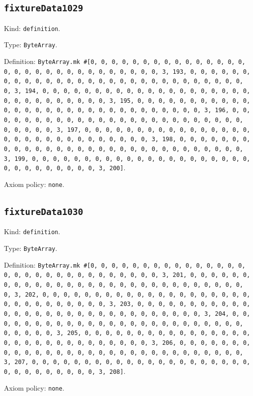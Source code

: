 \documentclass[11pt]{article}
\begin{document}
\subsection*{\texttt{fixtureData1029}}
\noindent Kind: \texttt{definition}.\par
\noindent Type: \texttt{ByteArray}.\par
\noindent Definition: \texttt{ByteArray.mk \#[0, 0, 0, 0, 0, 0, 0, 0, 0, 0, 0, 0, 0, 0, 0, 0, 0, 0, 0, 0, 0, 0, 0, 0, 0, 0, 0, 0, 0, 0, 3, 193, 0, 0, 0, 0, 0, 0, 0, 0, 0, 0, 0, 0, 0, 0, 0, 0, 0, 0, 0, 0, 0, 0, 0, 0, 0, 0, 0, 0, 0, 0, 3, 194, 0, 0, 0, 0, 0, 0, 0, 0, 0, 0, 0, 0, 0, 0, 0, 0, 0, 0, 0, 0, 0, 0, 0, 0, 0, 0, 0, 0, 0, 0, 3, 195, 0, 0, 0, 0, 0, 0, 0, 0, 0, 0, 0, 0, 0, 0, 0, 0, 0, 0, 0, 0, 0, 0, 0, 0, 0, 0, 0, 0, 0, 0, 3, 196, 0, 0, 0, 0, 0, 0, 0, 0, 0, 0, 0, 0, 0, 0, 0, 0, 0, 0, 0, 0, 0, 0, 0, 0, 0, 0, 0, 0, 0, 0, 3, 197, 0, 0, 0, 0, 0, 0, 0, 0, 0, 0, 0, 0, 0, 0, 0, 0, 0, 0, 0, 0, 0, 0, 0, 0, 0, 0, 0, 0, 0, 0, 3, 198, 0, 0, 0, 0, 0, 0, 0, 0, 0, 0, 0, 0, 0, 0, 0, 0, 0, 0, 0, 0, 0, 0, 0, 0, 0, 0, 0, 0, 0, 0, 3, 199, 0, 0, 0, 0, 0, 0, 0, 0, 0, 0, 0, 0, 0, 0, 0, 0, 0, 0, 0, 0, 0, 0, 0, 0, 0, 0, 0, 0, 0, 0, 3, 200]}.\par
\noindent Axiom policy: \texttt{none}.\par
\subsection*{\texttt{fixtureData1030}}
\noindent Kind: \texttt{definition}.\par
\noindent Type: \texttt{ByteArray}.\par
\noindent Definition: \texttt{ByteArray.mk \#[0, 0, 0, 0, 0, 0, 0, 0, 0, 0, 0, 0, 0, 0, 0, 0, 0, 0, 0, 0, 0, 0, 0, 0, 0, 0, 0, 0, 0, 0, 3, 201, 0, 0, 0, 0, 0, 0, 0, 0, 0, 0, 0, 0, 0, 0, 0, 0, 0, 0, 0, 0, 0, 0, 0, 0, 0, 0, 0, 0, 0, 0, 3, 202, 0, 0, 0, 0, 0, 0, 0, 0, 0, 0, 0, 0, 0, 0, 0, 0, 0, 0, 0, 0, 0, 0, 0, 0, 0, 0, 0, 0, 0, 0, 3, 203, 0, 0, 0, 0, 0, 0, 0, 0, 0, 0, 0, 0, 0, 0, 0, 0, 0, 0, 0, 0, 0, 0, 0, 0, 0, 0, 0, 0, 0, 0, 3, 204, 0, 0, 0, 0, 0, 0, 0, 0, 0, 0, 0, 0, 0, 0, 0, 0, 0, 0, 0, 0, 0, 0, 0, 0, 0, 0, 0, 0, 0, 0, 3, 205, 0, 0, 0, 0, 0, 0, 0, 0, 0, 0, 0, 0, 0, 0, 0, 0, 0, 0, 0, 0, 0, 0, 0, 0, 0, 0, 0, 0, 0, 0, 3, 206, 0, 0, 0, 0, 0, 0, 0, 0, 0, 0, 0, 0, 0, 0, 0, 0, 0, 0, 0, 0, 0, 0, 0, 0, 0, 0, 0, 0, 0, 0, 3, 207, 0, 0, 0, 0, 0, 0, 0, 0, 0, 0, 0, 0, 0, 0, 0, 0, 0, 0, 0, 0, 0, 0, 0, 0, 0, 0, 0, 0, 0, 0, 3, 208]}.\par
\noindent Axiom policy: \texttt{none}.\par
\end{document}
